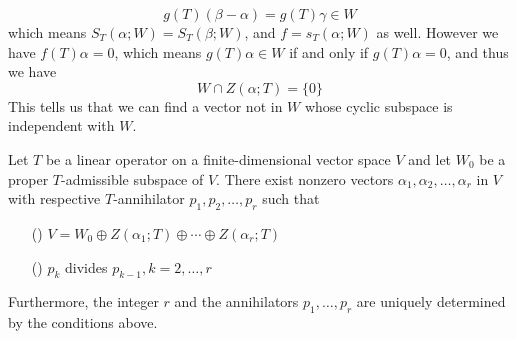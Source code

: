 \documentclass{article}
\begin{document}
\[g(T)(\beta-\alpha)=g(T)\gamma\in W\]
which means $S_T(\alpha;W)=S_T(\beta;W)$, and $f=s_T(\alpha;W)$ as well. However we have $f(T)\alpha=0$, which means $g(T)\alpha\in W$ if and only if $g(T)\alpha=0$, and thus we have
\[W\cap Z(\alpha;T)=\{0\}\]
This tells us that we can find a vector not in $W$ whose cyclic subspace is independent with $W$.\\
\begin{thm}
	Let $T$ be a linear operator on a finite-dimensional vector space $V$ and let $W_0$ be a proper $T$-admissible subspace of $V$. There exist nonzero vectors $\alpha_1,\alpha_2,\dots,\alpha_r$ in $V$ with respective $T$-annihilator $p_1,p_2,\dots,p_r$ such that
	\begin{enumerate}
		\item [(\romannumeral1)]$V=W_0\oplus Z(\alpha_1;T)\oplus\cdots\oplus Z(\alpha_r;T)$
		\item [(\romannumeral2)]$p_k$ divides $p_{k-1},k=2,\dots,r$
	\end{enumerate}
	Furthermore, the integer $r$ and the annihilators $p_1,\dots,p_r$ are uniquely determined by the conditions above.
\end{thm}
\end{document}
